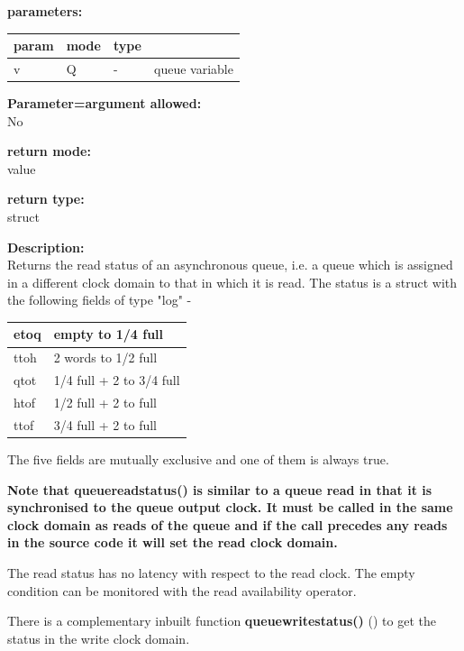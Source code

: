         {\bf parameters:} \\
        \begin{tabular}{| l | l | l | l |}
        \hline
        param  & mode & type & \\
        \hline \hline
        v & Q & - & queue variable \\ \hline
        \end{tabular}
        
        {\bf Parameter=argument allowed:} \\
        No
        
        {\bf return mode:} \\
        value

        {\bf return type:} \\
        struct
        
        {\bf Description:} \\
        Returns the read status of an asynchronous queue, i.e. a queue which
        is assigned in a different clock domain to that in which it is
        read. The status is a struct with the following fields of
        type "log" -

        \begin{tabular}{| l | l |}
        \hline
        etoq & empty to 1/4 full        \\ \hline
        ttoh & 2 words to 1/2 full      \\ \hline
        qtot & 1/4 full + 2 to 3/4 full \\ \hline
        htof & 1/2 full + 2 to full     \\ \hline 
        ttof & 3/4 full + 2 to full     \\ \hline  
        \end{tabular}

        The five fields are mutually exclusive and one of them is always true.

        {\bf Note that queuereadstatus() is similar to a queue read in that it is
        synchronised to the queue output clock. It must be called in the same
        clock domain as reads of the queue and if the call precedes any reads in
        the source code it will set the read clock domain.}

        The read status has no latency with respect to the read clock. The empty
        condition can be monitored with the read availability operator.
        
        There is a complementary inbuilt function {\bf queuewritestatus()}
        () to get the status in the write
        clock domain.

